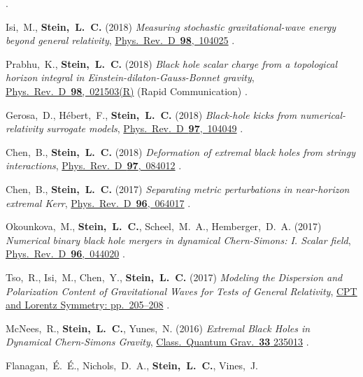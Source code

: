\begin{etaremune}[start=\value{pubCounter}]
  .
 \item
  Isi,~M., {\bf Stein,~L.~C.}
  (2018)
  {\it Measuring stochastic gravitational-wave energy beyond general relativity},
  \href{https://doi.org/10.1103/PhysRevD.98.104025}{Phys.~Rev.~D~{\bf 98},~104025}
  .
\item
  Prabhu,~K., {\bf Stein,~L.~C.}
  (2018)
  {\it Black hole scalar charge from a topological horizon integral in
    Einstein-dilaton-Gauss-Bonnet gravity},
  \href{https://doi.org/10.1103/PhysRevD.98.021503}{Phys.~Rev.~D~{\bf 98},~021503(R)}
  (Rapid Communication)
  .
\item
  Gerosa,~D., H\'ebert,~F., {\bf Stein,~L.~C.}
  (2018)
  {\it Black-hole kicks from numerical-relativity surrogate models},
  \href{https://doi.org/10.1103/PhysRevD.97.104049}{Phys.~Rev.~D~{\bf 97},~104049}
  .
\item
  Chen,~B., {\bf Stein,~L.~C.}
  (2018)
  {\it Deformation of extremal black holes from stringy interactions},
  \href{https://doi.org/10.1103/PhysRevD.97.084012}{Phys.~Rev.~D~{\bf 97},~084012}
  .
\item
  Chen,~B., {\bf Stein,~L.~C.}
  (2017)
  {\it Separating metric perturbations in near-horizon extremal Kerr},
  \href{https://doi.org/10.1103/PhysRevD.96.064017}{Phys.~Rev.~D~{\bf 96},~064017}
  .
\item
  Okounkova,~M.,
  {\bf Stein,~L.~C.},
  Scheel,~M.~A.,
  Hemberger,~D.~A.
  (2017)
  {\it Numerical binary black hole mergers in dynamical Chern-Simons:
    I. Scalar field},
  \href{https://doi.org/10.1103/PhysRevD.96.044020}{Phys.~Rev.~D~{\bf 96},~044020}
  .
\item
  Tso,~R., Isi,~M., Chen,~Y., {\bf Stein,~L.~C.}
  (2017)
  {\it Modeling the Dispersion and Polarization Content of
    Gravitational Waves for Tests of General Relativity},
  \href{http://dx.doi.org/10.1142/9789813148505_0052}{CPT and Lorentz Symmetry: pp.~205--208}
  .
\item
  McNees,~R., {\bf Stein,~L.~C.}, Yunes,~N.
  (2016)
  {\it Extremal Black Holes in Dynamical Chern-Simons Gravity},
  \href{http://dx.doi.org/10.1088/0264-9381/33/23/235013}{Class.~Quantum Grav.~{\bf 33} 235013}
  .
\item
  Flanagan,~\'E.~\'E., Nichols,~D.~A., {\bf Stein,~L.~C.}, Vines,~J.

\end{etaremune}
